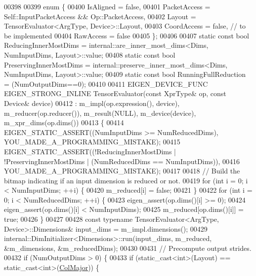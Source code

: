 \begin{DoxyCode}
00398 
00399   \textcolor{keyword}{enum} \{
00400     IsAligned = \textcolor{keyword}{false},
00401     PacketAccess = Self::InputPacketAccess && Op::PacketAccess,
00402     Layout = TensorEvaluator<ArgType, Device>::Layout,
00403     CoordAccess = \textcolor{keyword}{false},  \textcolor{comment}{// to be implemented}
00404     RawAccess = \textcolor{keyword}{false}
00405   \};
00406 
00407   \textcolor{keyword}{static} \textcolor{keyword}{const} \textcolor{keywordtype}{bool} ReducingInnerMostDims = internal::are\_inner\_most\_dims<Dims, NumInputDims,
       Layout>::value;
00408   \textcolor{keyword}{static} \textcolor{keyword}{const} \textcolor{keywordtype}{bool} PreservingInnerMostDims = internal::preserve\_inner\_most\_dims<Dims, NumInputDims,
       Layout>::value;
00409   \textcolor{keyword}{static} \textcolor{keyword}{const} \textcolor{keywordtype}{bool} RunningFullReduction = (NumOutputDims==0);
00410 
00411   EIGEN\_DEVICE\_FUNC EIGEN\_STRONG\_INLINE TensorEvaluator(\textcolor{keyword}{const} XprType& op, \textcolor{keyword}{const} Device& device)
00412       : m\_impl(op.expression(), device), m\_reducer(op.reducer()), m\_result(NULL), m\_device(device), 
      m\_xpr\_dims(op.dims())
00413   \{
00414     EIGEN\_STATIC\_ASSERT((NumInputDims >= NumReducedDims), YOU\_MADE\_A\_PROGRAMMING\_MISTAKE);
00415     EIGEN\_STATIC\_ASSERT((!ReducingInnerMostDims | !PreservingInnerMostDims | (NumReducedDims == 
      NumInputDims)),
00416                         YOU\_MADE\_A\_PROGRAMMING\_MISTAKE);
00417 
00418     \textcolor{comment}{// Build the bitmap indicating if an input dimension is reduced or not.}
00419     \textcolor{keywordflow}{for} (\textcolor{keywordtype}{int} i = 0; i < NumInputDims; ++i) \{
00420       m\_reduced[i] = \textcolor{keyword}{false};
00421     \}
00422     \textcolor{keywordflow}{for} (\textcolor{keywordtype}{int} i = 0; i < NumReducedDims; ++i) \{
00423       eigen\_assert(op.dims()[i] >= 0);
00424       eigen\_assert(op.dims()[i] < NumInputDims);
00425       m\_reduced[op.dims()[i]] = \textcolor{keyword}{true};
00426     \}
00427 
00428     \textcolor{keyword}{const} \textcolor{keyword}{typename} TensorEvaluator<ArgType, Device>::Dimensions& input\_dims = m\_impl.dimensions();
00429     internal::DimInitializer<Dimensions>::run(input\_dims, m\_reduced, &m\_dimensions, &m\_reducedDims);
00430 
00431     \textcolor{comment}{// Precompute output strides.}
00432     \textcolor{keywordflow}{if} (NumOutputDims > 0) \{
00433       \textcolor{keywordflow}{if} (static\_cast<int>(Layout) == static\_cast<int>(\hyperlink{group__enums_ggaacded1a18ae58b0f554751f6cdf9eb13a0cbd4bdd0abcfc0224c5fcb5e4f6669a}{ColMajor})) \{

\end{DoxyCode}
